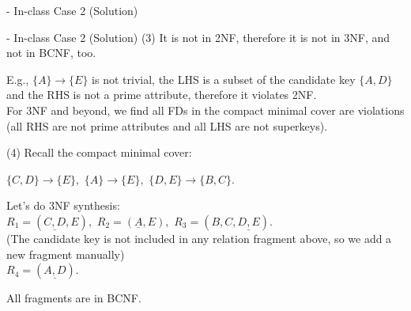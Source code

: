 \begin{frame}[fragile]{ - In-class Case 2 (Solution)}
\end{frame}


\begin{frame}[fragile]{ - In-class Case 2 (Solution)}
	(3)  It is not in 2NF, therefore it is not in 3NF, and not in BCNF, too.\\\vspace{3pt}
	
	E.g., $\{A\} \rightarrow \{E\}$ is not trivial, the LHS is a subset of the candidate key $\{A,D\}$ and the RHS is not a prime attribute, therefore it violates 2NF.\\\vspace{3pt}
	For 3NF and beyond, we find all FDs in the compact minimal cover are violations (all RHS are not prime attributes and all LHS are not superkeys).\\\vspace{5pt}
	
	(4) Recall the compact minimal cover:\\\vspace{3pt}
	
	$\{C,D\} \rightarrow \{E\},$
	$\{A\}  \rightarrow \{E\},$
	$\{D,E\} \rightarrow \{B,C\}.$\\\vspace{3pt}
	
	Let's do 3NF synthesis:\\ \vspace{3pt}
	$R_1 = (\underline{C,D},E),$
	$R_2 = (\underline{A}, E),$
	$R_3 = (B, C, \underline{D, E}).$\\\vspace{3pt}
	(The candidate key is not included in any relation fragment above, so we add a new fragment manually)\\\vspace{3pt}
	$R_4 = (\underline{A, D}).$\\\vspace{3pt}
	
	All fragments are in BCNF.
	

\end{frame}

